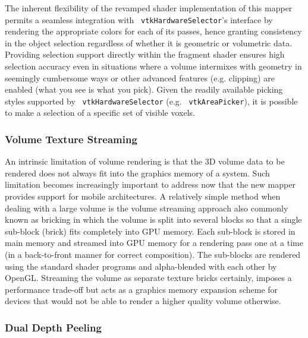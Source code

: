 The inherent flexibility of the revamped shader implementation of this mapper permits a seamless integration with ~\texttt{vtkHardwareSelector}'s interface by rendering the appropriate colors for each of its passes, hence granting consistency in the object selection regardless of whether it is geometric or volumetric data.  Providing selection support directly within the fragment shader ensures high selection accuracy even in situations where a volume intermixes with geometry in seemingly cumbersome ways or other advanced features (e.g. clipping) are enabled (what you see is what you pick).  Given the readily available picking styles supported by ~\texttt{vtkHardwareSelector} (e.g. ~\texttt{vtkAreaPicker}), it is possible to make a selection of a specific set of visible voxels.

\subsubsection{Volume Texture Streaming}
An intrinsic limitation of volume rendering is that the 3D volume data to be rendered does not always fit into the graphics memory of a system. Such limitation becomes increasingly important to address now that the new mapper provides support for mobile architectures.
A relatively simple method when dealing with a large volume is the volume streaming approach also commonly known as bricking in which the volume is split into several blocks so that a single sub-block (brick) fits completely into GPU memory.  Each sub-block is stored in main memory and streamed into GPU memory for a rendering pass one at a time (in a back-to-front manner for correct composition). The sub-blocks are rendered using the standard shader programs and alpha-blended with each other by OpenGL. Streaming the volume as separate texture bricks certainly, imposes a performance trade-off but acts as a graphics memory expansion scheme for devices that would not be able to render a higher quality volume otherwise.

\subsubsection{Dual Depth Peeling}
 
 
